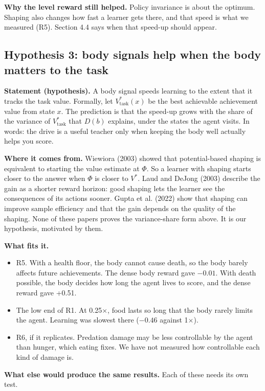 \documentclass[11pt]{article}
\begin{document}
\textbf{Why the level reward still helped.} Policy invariance is about the optimum. Shaping also changes how fast a learner gets there, and that speed is what we measured (R5). Section 4.4 says when that speed-up should appear.

\subsection{Hypothesis 3: body signals help when the body matters to the task}

\textbf{Statement (hypothesis).} A body signal speeds learning to the extent that it tracks the task value. Formally, let $V^*_{\text{task}}(x)$ be the best achievable achievement value from state $x$. The prediction is that the speed-up grows with the share of the variance of $V^*_{\text{task}}$ that $D(b)$ explains, under the states the agent visits. In words: the drive is a useful teacher only when keeping the body well actually helps you score.

\textbf{Where it comes from.} Wiewiora (2003) showed that potential-based shaping is equivalent to starting the value estimate at $\Phi$. So a learner with shaping starts closer to the answer when $\Phi$ is closer to $V^*$. Laud and DeJong (2003) describe the gain as a shorter reward horizon: good shaping lets the learner see the consequences of its actions sooner. Gupta et al. (2022) show that shaping can improve sample efficiency and that the gain depends on the quality of the shaping. None of these papers proves the variance-share form above. It is our hypothesis, motivated by them.

\textbf{What fits it.}

\begin{itemize}
\item R5. With a health floor, the body cannot cause death, so the body barely affects future achievements. The dense body reward gave $-0.01$. With death possible, the body decides how long the agent lives to score, and the dense reward gave +0.51.
\item The low end of R1. At 0.25$\times$, food lasts so long that the body rarely limits the agent. Learning was slowest there ($-0.46$ against 1$\times$).
\item R6, if it replicates. Predation damage may be less controllable by the agent than hunger, which eating fixes. We have not measured how controllable each kind of damage is.
\end{itemize}

\textbf{What else would produce the same results.} Each of these needs its own test.
\end{document}
